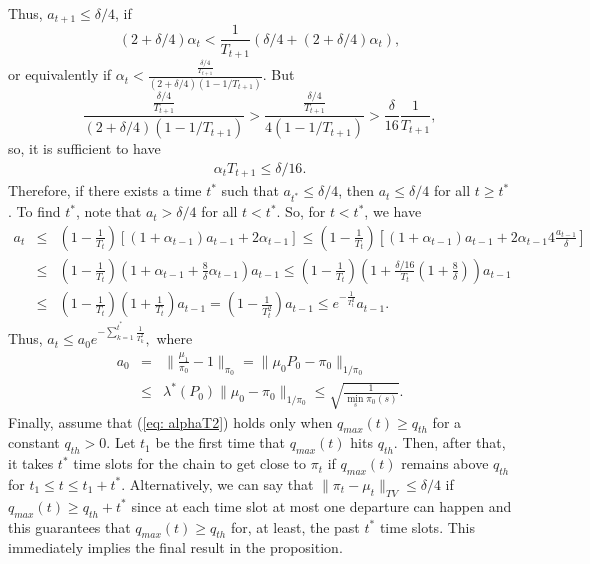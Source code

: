\documentclass[10pt,onecolumn,draftclsnofoot,journal]{IEEEtran}
\newcommand{\be}{\begin{eqnarray}}
\newcommand{\ee}{\end{eqnarray}}
\begin{document}
Thus, $a_{t+1} \leq \delta/4$, if
$$
(2+\delta/4)\alpha_t < \frac{1}{T_{t+1}}(\delta/4+(2+\delta/4)\alpha_t),
$$
or equivalently if $
\alpha_t < \frac{\frac{\delta/4}{T_{t+1}}}{(2+\delta/4)(1-1/T_{t+1})}.
$
But
$$
\frac{\frac{\delta/4}{T_{t+1}}}{(2+\delta/4)(1-1/T_{t+1})} > \frac{\frac{\delta/4}{T_{t+1}}}{4(1-1/T_{t+1})} > \frac{\delta}{16}\frac{1}{T_{t+1}},
$$
so, it is sufficient to have
\be \label{eq: alphaT2}
\alpha_t T_{t+1} \leq \delta/16.
\ee
Therefore, if there exists a time $t^*$ such that $a_{t^*} \leq \delta/4$, then $a_{t} \leq \delta/4$ for all $t \geq t^*$.
To find $t^*$, note that $a_t > \delta/4$ for all $t< t^*$. So, for $t<t^*$, we have
\begin{eqnarray*}
a_t &\leq & (1-\frac{1}{T_t})[(1+\alpha_{t-1})a_{t-1}+2\alpha_{t-1}]\leq  (1-\frac{1}{T_t})[(1+\alpha_{t-1})a_{t-1}+2\alpha_{t-1}4\frac{a_{t-1}}{\delta}]\\
& \leq & (1-\frac{1}{T_t})(1+\alpha_{t-1}+\frac{8}{\delta}\alpha_{t-1})a_{t-1}\leq (1-\frac{1}{T_t})(1+\frac{\delta/16}{T_t}(1+\frac{8}{\delta}))a_{t-1}\\
& \leq & (1-\frac{1}{T_t})(1+\frac{1}{T_t}) a_{t-1}= (1-\frac{1}{T^2_t})a_{t-1} \leq  e^{-\frac{1}{T^2_t}}a_{t-1}.
\end{eqnarray*}
Thus, $
a_t \leq a_0 e^{-\sum_{k=1}^{t^*}\frac{1}{T^2_k}},
$
 where
 \begin{eqnarray*}
a_0 &=&  \|\frac{\mu_1}{\pi_0}-1\|_{\pi_0}  =  \|\mu_0P_0-\pi_0\|_{1/ \pi_0}\\
&\leq&  \lambda^*(P_0)\|\mu_0-\pi_0\|_{1/ \pi_0}  \leq  \sqrt{\frac{1}{\min_s\pi_0(s)}}.
 \end{eqnarray*}
Finally, assume that (\ref{eq: alphaT2}) holds only when $q_{max}(t) \geq q_{th}$ for a constant $q_{th} > 0$. Let $t_1$ be the first time that $q_{max}(t)$ hits $q_{th}$.
Then, after that, it takes $t^*$ time slots for the chain to get close to $\pi_t$ if $q_{max}(t)$ remains above $q_{th}$ for $t_1 \leq t \leq t_1+t^*$.
Alternatively, we can say that $\|\pi_t-\mu_t\|_{TV} \leq \delta/4$ if $q_{max}(t) \geq q_{th}+t^*$ since at each time slot at most one departure can happen and this guarantees that $q_{max}(t) \geq q_{th}$ for, at least, the past $t^*$ time slots. This immediately implies the final result in the proposition.
\end{document}

